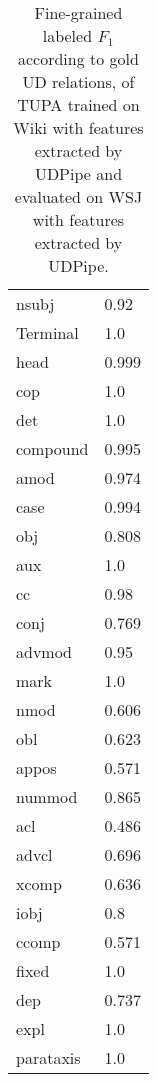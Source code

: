 \documentclass[11pt,a4paper]{article}
\begin{document}
\begin{table}[t]
\centering
\small
\setlength\tabcolsep{3pt}
\begin{tabular}{l|l}
nsubj & 0.92 \\ 
Terminal & 1.0 \\ 
head & 0.999 \\ 
cop & 1.0 \\ 
det & 1.0 \\    
compound & 0.995 \\ 
amod & 0.974 \\ 
case & 0.994 \\ 
obj & 0.808 \\ 
aux & 1.0 \\ 
cc & 0.98 \\ 
conj & 0.769 \\ 
advmod & 0.95 \\ 
mark & 1.0 \\ 
nmod & 0.606 \\ 
obl & 0.623 \\ 
appos & 0.571 \\ 
nummod & 0.865 \\ 
acl & 0.486 \\ 
advcl & 0.696 \\ 
xcomp & 0.636 \\ 
iobj & 0.8 \\ 
ccomp & 0.571 \\ 
fixed & 1.0 \\ 
dep & 0.737 \\ 
expl & 1.0 \\  
parataxis & 1.0
\end{tabular}
\caption{
Fine-grained labeled $F_1$ according to gold UD relations,
of TUPA trained on Wiki with features extracted by UDPipe
and evaluated on WSJ with features extracted by UDPipe.}
\label{tab:fine_grained_ud}
\end{table}


%
%
%
%
%
%
%
%




\end{document}
